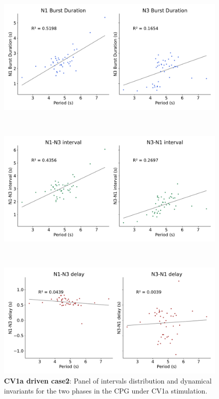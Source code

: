 \begin{figure}[htbp]
\begin{minipage}[b]{0.55\textwidth}
		\begin{minipage}[b]{\textwidth}
			\centering
			\includegraphics[width=\textwidth]{./invariants/data/SUSSEX/CV1a_driven2/images/stim_cv1a2_durations.pdf}
		\end{minipage}\\
		\begin{minipage}[b]{\textwidth}
			\centering
			\includegraphics[width=\textwidth]{./invariants/data/SUSSEX/CV1a_driven2/images/stim_cv1a2_intervals.pdf}
		\end{minipage}\\
		\begin{minipage}[b]{\textwidth}
			\centering
			\includegraphics[width=\textwidth]{./invariants/data/SUSSEX/CV1a_driven2/images/stim_cv1a2_delays.pdf}
		\end{minipage}
	\end{minipage}
	\caption{\textbf{CV1a driven case2}: Panel of intervals distribution and dynamical invariants for the two phases in the CPG under CV1a stimulation.}
	\label{fig:cv1a 2 2phases}
\end{figure}




